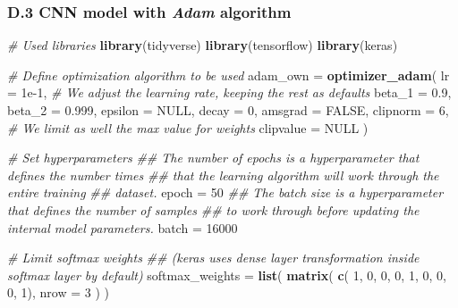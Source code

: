\documentclass[12pt,]{article}
\newenvironment{Shaded}{\begin{snugshade}}{\end{snugshade}}
\newcommand{\CommentTok}[1]{\textcolor[rgb]{0.56,0.35,0.01}{\textit{#1}}}
\newcommand{\DataTypeTok}[1]{\textcolor[rgb]{0.13,0.29,0.53}{#1}}
\newcommand{\DecValTok}[1]{\textcolor[rgb]{0.00,0.00,0.81}{#1}}
\newcommand{\FloatTok}[1]{\textcolor[rgb]{0.00,0.00,0.81}{#1}}
\newcommand{\KeywordTok}[1]{\textcolor[rgb]{0.13,0.29,0.53}{\textbf{#1}}}
\newcommand{\NormalTok}[1]{#1}
\newcommand{\OtherTok}[1]{\textcolor[rgb]{0.56,0.35,0.01}{#1}}
\newcommand{\StringTok}[1]{\textcolor[rgb]{0.31,0.60,0.02}{#1}}
\begin{document}
\hypertarget{d.3-cnn-model-with-adam-algorithm}{%
\subsubsection*{\texorpdfstring{D.3 CNN model with \emph{Adam}
algorithm}{D.3 CNN model with Adam algorithm}}\label{d.3-cnn-model-with-adam-algorithm}}

\begin{Shaded}
\begin{Highlighting}[]
\CommentTok{# Used libraries }
\KeywordTok{library}\NormalTok{(tidyverse)}
\KeywordTok{library}\NormalTok{(tensorflow)}
\KeywordTok{library}\NormalTok{(keras)}

\CommentTok{# Define optimization algorithm to be used}
\NormalTok{adam_own =}\StringTok{ }\KeywordTok{optimizer_adam}\NormalTok{(}
    \DataTypeTok{lr =} \FloatTok{1e-1}\NormalTok{, }\CommentTok{# We adjust the learning rate, keeping the rest as defaults}
    \DataTypeTok{beta_1 =} \FloatTok{0.9}\NormalTok{, }
    \DataTypeTok{beta_2 =} \FloatTok{0.999}\NormalTok{,}
    \DataTypeTok{epsilon =} \OtherTok{NULL}\NormalTok{, }
    \DataTypeTok{decay =} \DecValTok{0}\NormalTok{, }
    \DataTypeTok{amsgrad =} \OtherTok{FALSE}\NormalTok{, }
    \DataTypeTok{clipnorm =} \DecValTok{6}\NormalTok{, }\CommentTok{# We limit as well the max value for weights}
    \DataTypeTok{clipvalue =} \OtherTok{NULL}
\NormalTok{)}

\CommentTok{# Set hyperparameters }
\CommentTok{## The number of epochs is a hyperparameter that defines the number times }
\CommentTok{## that the learning algorithm will work through the entire training }
\CommentTok{## dataset.}
\NormalTok{epoch =}\StringTok{ }\DecValTok{50}
\CommentTok{## The batch size is a hyperparameter that defines the number of samples }
\CommentTok{## to work through before updating the internal model parameters.}
\NormalTok{batch =}\StringTok{ }\DecValTok{16000}

\CommentTok{# Limit softmax weights }
\CommentTok{## (keras uses dense layer transformation inside softmax layer by default)}
\NormalTok{softmax_weights =}\StringTok{ }\KeywordTok{list}\NormalTok{(}
    \KeywordTok{matrix}\NormalTok{(}
        \KeywordTok{c}\NormalTok{(  }\DecValTok{1}\NormalTok{,  }\DecValTok{0}\NormalTok{,  }\DecValTok{0}\NormalTok{,}
            \DecValTok{0}\NormalTok{,  }\DecValTok{1}\NormalTok{,  }\DecValTok{0}\NormalTok{,}
            \DecValTok{0}\NormalTok{,  }\DecValTok{0}\NormalTok{,  }\DecValTok{1}\NormalTok{), }
        \DataTypeTok{nrow =} \DecValTok{3}
\NormalTok{    )}
\NormalTok{)}


\end{Highlighting}
\end{Shaded}
\end{document}
